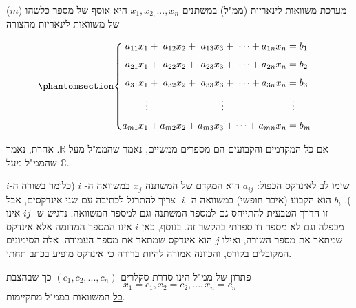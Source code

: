 \documentclass[
  hebrew,
  12pt,
  a4paper,
  oneside]{book}
\theoremstyle{definition}
\theoremstyle{remark}
\theoremstyle{plain}
\theoremstyle{remark}
\begin{document}
\begin{definition}

מערכת משוואות לינאריות (ממ"ל) במשתנים \(x_1,x_{2,}...,x_n\) היא אוסף של
מספר כלשהו (\(m\)) של משוואות לינאריות מהצורה

\begin{equation}\phantomsection\label{eq-linear-eqs}{
\begin{cases}
\begin{alignedat}{7}
a_{11}x_1 &{}+{}& a_{12}x_2 &{}+{}& a_{13}x_3 &{}+{}& \dots + a_{1n}x_n &= b_1 \\[4pt]
a_{21}x_1 &{}+{}& a_{22}x_2 &{}+{}& a_{23}x_3 &{}+{}& \dots + a_{2n}x_n &= b_2 \\[4pt]
a_{31}x_1 &{}+{}& a_{32}x_2 &{}+{}& a_{33}x_3 &{}+{}& \dots + a_{3n}x_n &= b_3 \\[4pt]
\vdots& & & & \vdots & & & \;\;\vdots \\[4pt]
a_{m1}x_1 &{}+{}& a_{m2}x_2 &{}+{}& a_{m3}x_3 &{}+{}& \dots + a_{mn}x_n &= b_m
\end{alignedat}
\end{cases}
}\end{equation}

אם כל המקדמים והקבועים הם מספרים ממשיים, נאמר שהממ"ל מעל \(\mathbb R\).
אחרת, נאמר שהממ"ל מעל \(\mathbb C\).

\end{definition}

שימו לב לאינדקס הכפול: \(a_{ij}\) הוא המקדם של המשתנה \(x_{j}\) במשוואה
ה- \(i\) (כלומר בשורה ה-\(i\)). \(b_{i}\) הוא הקבוע (איבר חופשי) במשוואה
ה- \(i\). צריך להתרגל לכתיבה עם שני אינדקסים, אבל זו הדרך הטבעית להתייחס
גם למספר המשתנה וגם למספר המשוואה. נדגיש ש- \(ij\) אינו מכפלה וגם לא
מספר דו-ספרתי בהקשר זה. בנוסף, כאן \(i\) אינו המספר המדומה אלא אינדקס
שמתאר את מספר השורה, ואילו \(j\) הוא אינדקס שמתאר את מספר העמודה. אלה
הסימונים המקובלים בקורס, והכוונה אמורה להיות ברורה כי אינדקס מופיע בכתב
תחתי.

\begin{definition}

פתרון של ממ"ל הינו סדרת סקלרים \((c_1,c_2,...,c_n)\) כך שבהצבת
\[x_1=c_1,x_2=c_2,...,x_n=c_n\] \ul{כל} המשוואות בממ"ל מתקיימות.

\end{definition}
\end{document}
